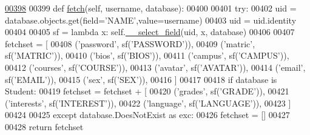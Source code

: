 \begin{DoxyCode}
\hypertarget{classProfile_1_1ProfileUnit_1_1PersProfile_l00398}{}\hyperlink{classProfile_1_1ProfileUnit_1_1PersProfile_aca301abc09bc12a7cf0a61437f941a8a}{00398} 
00399     \textcolor{keyword}{def }\hyperlink{classProfile_1_1ProfileUnit_1_1PersProfile_aca301abc09bc12a7cf0a61437f941a8a}{fetch}(self, username, database):
00400 
00401         \textcolor{keywordflow}{try}:
00402             uid = database.objects.get(field=\textcolor{stringliteral}{'NAME'},value=username)
00403             uid = uid.identity
00404 
00405             sf = \textcolor{keyword}{lambda} x: self.\hyperlink{classProfile_1_1ProfileUnit_1_1PersProfile_a48bc2c04d89772752559fc19dc79f321}{\_\_select\_field}(uid, x, database)
00406 
00407             fetchset = [
00408                     (\textcolor{stringliteral}{'password'},    sf(\textcolor{stringliteral}{'PASSWORD'})),
00409                     (\textcolor{stringliteral}{'matric'},      sf(\textcolor{stringliteral}{'MATRIC'})),
00410                     (\textcolor{stringliteral}{'bios'},        sf(\textcolor{stringliteral}{'BIOS'})),
00411                     (\textcolor{stringliteral}{'campus'},      sf(\textcolor{stringliteral}{'CAMPUS'})),
00412                     (\textcolor{stringliteral}{'courses'},     sf(\textcolor{stringliteral}{'COURSE'})),
00413                     (\textcolor{stringliteral}{'avatar'},      sf(\textcolor{stringliteral}{'AVATAR'})),
00414                     (\textcolor{stringliteral}{'email'},       sf(\textcolor{stringliteral}{'EMAIL'})),
00415                     (\textcolor{stringliteral}{'sex'},         sf(\textcolor{stringliteral}{'SEX'})),
00416             ]
00417 
00418             \textcolor{keywordflow}{if} database \textcolor{keywordflow}{is} Student:
00419                 fetchset = fetchset + [     
00420                     (\textcolor{stringliteral}{'grades'},      sf(\textcolor{stringliteral}{'GRADE'})),
00421                     (\textcolor{stringliteral}{'interests'},   sf(\textcolor{stringliteral}{'INTEREST'})),
00422                     (\textcolor{stringliteral}{'language'},    sf(\textcolor{stringliteral}{'LANGUAGE'})),
00423                 ]
00424 
00425         \textcolor{keywordflow}{except} database.DoesNotExist \textcolor{keyword}{as} exc:
00426             fetchset = []
00427 
00428         \textcolor{keywordflow}{return} fetchset

\end{DoxyCode}
